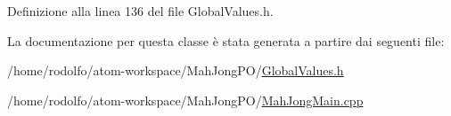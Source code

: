 Definizione alla linea 136 del file Global\+Values.\+h.



La documentazione per questa classe è stata generata a partire dai seguenti file\+:\begin{DoxyCompactItemize}
\item 
/home/rodolfo/atom-\/workspace/\+Mah\+Jong\+P\+O/\hyperlink{_global_values_8h}{Global\+Values.\+h}\item 
/home/rodolfo/atom-\/workspace/\+Mah\+Jong\+P\+O/\hyperlink{_mah_jong_main_8cpp}{Mah\+Jong\+Main.\+cpp}\end{DoxyCompactItemize}
